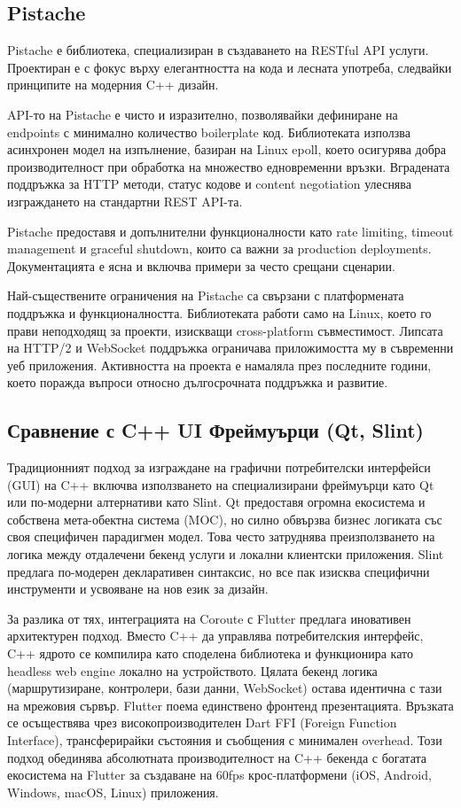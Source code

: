 \subsection{Pistache}

Pistache \cite{pistache} е библиотека, специализиран в създаването на RESTful API услуги. Проектиран е с фокус върху елегантността на кода и лесната употреба, следвайки принципите на модерния C++ дизайн.

API-то на Pistache е чисто и изразително, позволявайки дефиниране на endpoints с минимално количество boilerplate код. Библиотеката използва асинхронен модел на изпълнение, базиран на Linux epoll, което осигурява добра производителност при обработка на множество едновременни връзки. Вградената поддръжка за HTTP методи, статус кодове и content negotiation улеснява изграждането на стандартни REST API-та.

Pistache предоставя и допълнителни функционалности като rate limiting, timeout management и graceful shutdown, които са важни за production deployments. Документацията е ясна и включва примери за често срещани сценарии.

Най-съществените ограничения на Pistache са свързани с платформената поддръжка и функционалността. Библиотеката работи само на Linux, което го прави неподходящ за проекти, изискващи cross-platform съвместимост. Липсата на HTTP/2 и WebSocket поддръжка ограничава приложимостта му в съвременни уеб приложения. Активността на проекта е намаляла през последните години, което поражда въпроси относно дългосрочната поддръжка и развитие.

\subsection{Сравнение с C++ UI Фреймуърци (Qt, Slint)}

Традиционният подход за изграждане на графични потребителски интерфейси (GUI) на C++ включва използването на специализирани фреймуърци като Qt или по-модерни алтернативи като Slint. Qt предоставя огромна екосистема и собствена мета-обектна система (MOC), но силно обвързва бизнес логиката със своя специфичен парадигмен модел. Това често затруднява преизползването на логика между отдалечени бекенд услуги и локални клиентски приложения. Slint предлага по-модерен декларативен синтаксис, но все пак изисква специфични инструменти и усвояване на нов език за дизайн.

За разлика от тях, интеграцията на Coroute с Flutter предлага иновативен архитектурен подход. Вместо C++ да управлява потребителския интерфейс, C++ ядрото се компилира като споделена библиотека и функционира като headless web engine локално на устройството. Цялата бекенд логика (маршрутизиране, контролери, бази данни, WebSocket) остава идентична с тази на мрежовия сървър. Flutter поема единствено фронтенд презентацията. Връзката се осъществява чрез високопроизводителен Dart FFI (Foreign Function Interface), трансферирайки състояния и съобщения с минимален overhead. Този подход обединява абсолютната производителност на C++ бекенда с богатата екосистема на Flutter за създаване на 60fps крос-платформени (iOS, Android, Windows, macOS, Linux) приложения.

